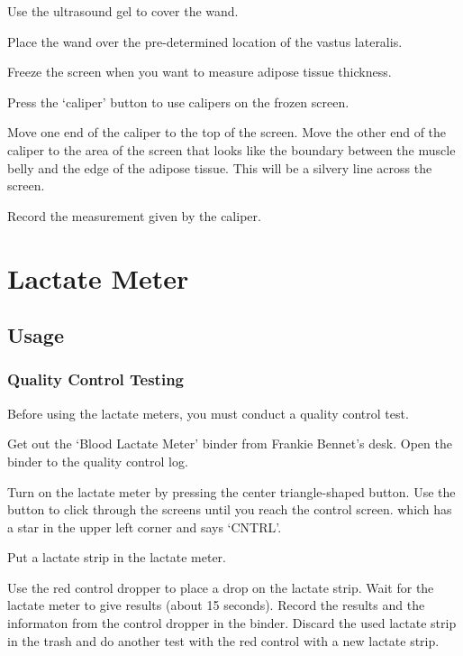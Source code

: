 \documentclass[
]{book}
\begin{document}
Use the ultrasound gel to cover the wand.

Place the wand over the pre-determined location of the vastus lateralis.

Freeze the screen when you want to measure adipose tissue thickness.

Press the `caliper' button to use calipers on the frozen screen.

Move one end of the caliper to the top of the screen. Move the other end of the caliper to the area of the screen that looks like the boundary between the muscle belly and the edge of the adipose tissue. This will be a silvery line across the screen.

Record the measurement given by the caliper.

\hypertarget{Appendix-Instruments-LactateMeter}{%
\section{Lactate Meter}\label{Appendix-Instruments-LactateMeter}}

\hypertarget{Appendix-Instruments-LactateMeter-Usage}{%
\subsection{Usage}\label{Appendix-Instruments-LactateMeter-Usage}}

\hypertarget{Appendix-Instruments-LactateMeter-Usage-QualityControl}{%
\subsubsection{Quality Control Testing}\label{Appendix-Instruments-LactateMeter-Usage-QualityControl}}

Before using the lactate meters, you must conduct a quality control test.

Get out the `Blood Lactate Meter' binder from Frankie Bennet's desk. Open the binder to the quality control log.

Turn on the lactate meter by pressing the center triangle-shaped button. Use the button to click through the screens until you reach the control screen. which has a star in the upper left corner and says `CNTRL'.

Put a lactate strip in the lactate meter.

Use the red control dropper to place a drop on the lactate strip. Wait for the lactate meter to give results (about 15 seconds). Record the results and the informaton from the control dropper in the binder. Discard the used lactate strip in the trash and do another test with the red control with a new lactate strip.
\end{document}
